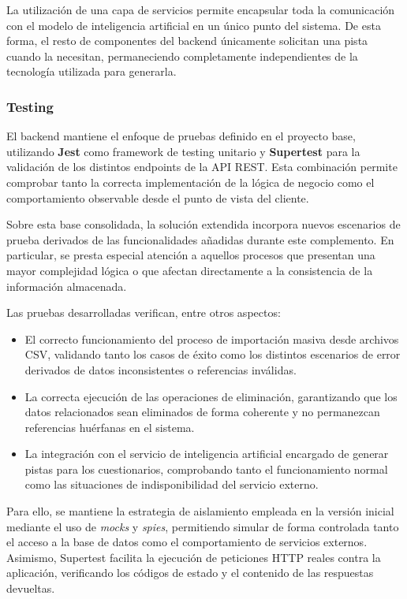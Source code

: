 La utilización de una capa de servicios permite encapsular toda la comunicación con el modelo de inteligencia artificial en un único punto del sistema. De esta forma, el resto de componentes del backend únicamente solicitan una pista cuando la necesitan, permaneciendo completamente independientes de la tecnología utilizada para generarla.

\subsubsection{Testing}

El backend mantiene el enfoque de pruebas definido en el proyecto base, utilizando \textbf{Jest} como framework de testing unitario y \textbf{Supertest} para la validación de los distintos endpoints de la API REST. Esta combinación permite comprobar tanto la correcta implementación de la lógica de negocio como el comportamiento observable desde el punto de vista del cliente.

Sobre esta base consolidada, la solución extendida incorpora nuevos escenarios de prueba derivados de las funcionalidades añadidas durante este complemento. En particular, se presta especial atención a aquellos procesos que presentan una mayor complejidad lógica o que afectan directamente a la consistencia de la información almacenada.

Las pruebas desarrolladas verifican, entre otros aspectos:

\begin{itemize}
    \item El correcto funcionamiento del proceso de importación masiva desde archivos CSV, validando tanto los casos de éxito como los distintos escenarios de error derivados de datos inconsistentes o referencias inválidas.
    \item La correcta ejecución de las operaciones de eliminación, garantizando que los datos relacionados sean eliminados de forma coherente y no permanezcan referencias huérfanas en el sistema.
    \item La integración con el servicio de inteligencia artificial encargado de generar pistas para los cuestionarios, comprobando tanto el funcionamiento normal como las situaciones de indisponibilidad del servicio externo.
\end{itemize}

Para ello, se mantiene la estrategia de aislamiento empleada en la versión inicial mediante el uso de \textit{mocks} y \textit{spies}, permitiendo simular de forma controlada tanto el acceso a la base de datos como el comportamiento de servicios externos. Asimismo, Supertest facilita la ejecución de peticiones HTTP reales contra la aplicación, verificando los códigos de estado y el contenido de las respuestas devueltas.

